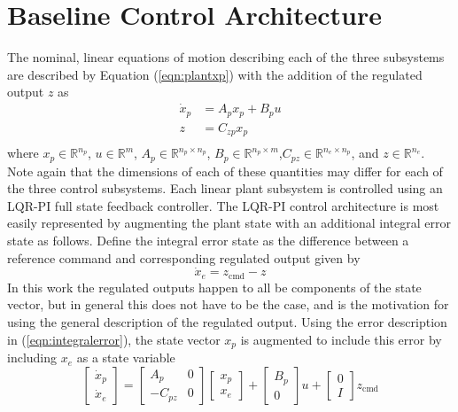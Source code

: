 \section{Baseline Control Architecture}
The nominal, linear equations of motion describing each of the three subsystems are described by Equation (\ref{eqn:plantxp}) with the addition of the regulated output $z$ as
\begin{equation}
  \label{eqn:xdotp}
  \begin{split}
    \dot{x}_{p}&=A_{p}x_{p}+B_{p}u \\
    z&=C_{zp}x_{p} \\
  \end{split}
\end{equation}
where $x_{p}\in\mathbb{R}^{n_{p}}$, $u\in\mathbb{R}^{m}$, $A_{p}\in\mathbb{R}^{n_{p}\times n_{p}}$, $B_{p}\in\mathbb{R}^{n_{p}\times m}$,$C_{pz}\in\mathbb{R}^{n_{e}\times n_{p}}$, and $z\in\mathbb{R}^{n_{e}}$.
Note again that the dimensions of each of these quantities may differ for each of the three control subsystems.
Each linear plant subsystem is controlled using an LQR-PI full state feedback controller.
The LQR-PI control architecture is most easily represented by augmenting the plant state with an additional integral error state as follows.
Define the integral error state as the difference between a reference command and corresponding regulated output given by
\begin{equation}
  \label{eqn:integralerror}
  \dot{x}_{e}=z_{\text{cmd}}-z
\end{equation}
In this work the regulated outputs happen to all be components of the state vector, but in general this does not have to be the case, and is the motivation for using the general description of the regulated output.
Using the error description in (\ref{eqn:integralerror}), the state vector $x_{p}$ is augmented to include this error by including $x_{e}$ as a state variable
\begin{equation}
  \label{lqrpi_linear_ss_eqn}
  \begin{bmatrix}
    \dot{x}_{p} \\
    \dot{x}_{e}
  \end{bmatrix}
  =
  \begin{bmatrix}
    A_{p} & 0 \\
    -C_{pz} & 0
  \end{bmatrix}
  \begin{bmatrix}
    x_{p} \\
    x_{e}
  \end{bmatrix}
  +
  \begin{bmatrix}
    B_{p} \\
    0
  \end{bmatrix}u
  +
  \begin{bmatrix}
    0 \\
    I
  \end{bmatrix}z_{\text{cmd}}
\end{equation}
